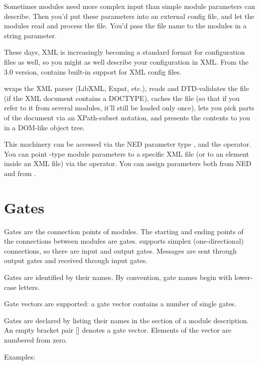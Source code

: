 Sometimes modules need more complex input than simple module parameters
can describe. Then you'd put these parameters into an external config file,
and let the modules read and process the file. You'd pass the file name
to the modules in a string parameter.

These days, XML is increasingly becoming a standard format for configuration
files as well, so you might as well describe your configuration in XML.
From the 3.0 version, {\opp} contains built-in support for XML config files.

{\opp} wraps the XML parser (LibXML, Expat, etc.), reads and DTD-validates
the file (if the XML document contains a DOCTYPE), caches the file
(so that if you refer to it from several modules, it'll still be loaded
only once), lets you pick parts of the document via an XPath-subset notation,
and presents the contents to you in a DOM-like object tree.

This machinery can be accessed via the NED parameter type , and the
 operator. You can point -type module parameters
to a specific XML file (or to an element inside an XML file) via the
 operator. You can assign  parameters both from NED
and from .




\section{Gates}
\label{sec:ch-ned-lang:simple-module-gates}


Gates are the connection points of modules. The starting and
ending points of the connections between modules are gates. {\opp}
supports simplex (one-directional) connections, so there are
input and output gates. Messages are sent through
output gates and received through input gates.

Gates are identified by their names.
By convention, gate names begin with lower-case letters.

Gate vectors are supported: a gate vector
contains a number of single gates.

Gates are declared by listing their names in the
 section of a module description. An
empty bracket pair [] denotes a gate vector.
Elements of the vector are numbered from zero.

Examples:

